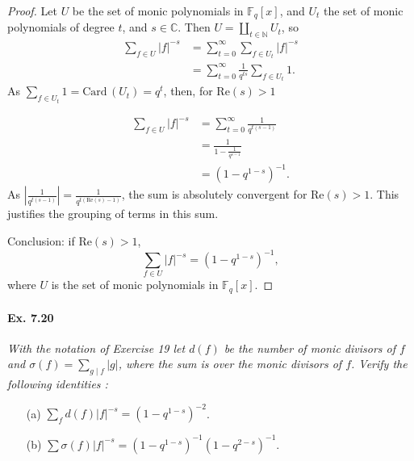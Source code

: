 \documentclass[11pt,a4paper]{article}
\newcommand{\N}{\mathbb{N}}
\newcommand{\C}{\mathbb{C}}
\begin{document}
\begin{proof}
Let $U$ be the set of monic polynomials in $\mathbb{F}_q[x]$, and $U_t$ the set of monic polynomials of degree $t$, and $s\in \C$. Then $U = \coprod_{t \in \N} U_t$, so
\begin{align*}
\sum_{f \in U} \vert f \vert^{-s }&= \sum_{t=0}^\infty \sum_{f \in U_t} \vert f \vert^{-s}\\
&=\sum_{t=0}^\infty \frac{1}{q^{ts}} \sum_{f\in U_t} 1.
\end{align*}
As $\sum_{f\in U_t} 1 = \mathrm{Card} \, (U_t) = q^t$, then, for $\mathrm{Re}(s) >1$

\begin{align*}
\sum_{f \in U} \vert f \vert^{-s } &= \sum_{t=0}^\infty \frac{1}{q^{t(s-1)}}\\
&=\frac{1}{1-\frac{1}{q^{s-1}}}\\
&= (1-q^{1-s})^{-1}.
\end{align*}
As $\left | \frac{1}{q^{t(s-1)}} \right | = \frac{1}{q^{t(\mathrm{Re}(s)-1)}}$, the sum is absolutely convergent for $\mathrm{Re}(s)>1$. This justifies the grouping of terms in this sum.

\bigskip

Conclusion:  if $\mathrm{Re}(s)>1$, 
$$\sum_{f \in U} \vert f \vert^{-s } =(1-q^{1-s})^{-1},$$
where $U$ is the set of monic polynomials in  $\mathbb{F}_q[x]$.
\end{proof}

\paragraph{Ex. 7.20}

{\it With the notation of Exercise 19 let $d(f)$ be the number of monic divisors of $f$ and $\sigma(f) = \sum_{g\mid f} |g|$, where the sum is over the monic divisors of $f$. Verify the following identities :
\begin{enumerate}
\item[(a)] $\sum_f d(f) |f|^{-s} = (1 -q^{1-s})^{-2}$.
\item[(b)] $\sum \sigma(f)|f|^{-s} = (1-q^{1-s})^{-1} (1-q^{2-s})^{-1}$.
\end{enumerate}

}
\end{document}

